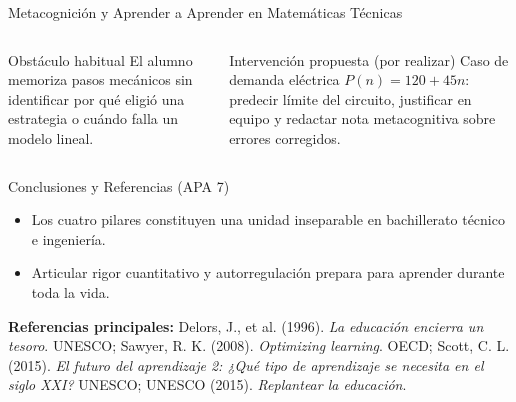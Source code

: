 \documentclass[aspectratio=169,spanish,xcolor=table]{beamer}
\begin{document}
\begin{frame}{Metacognición y Aprender a Aprender en Matemáticas Técnicas}
  \begin{columns}[T]
      \begin{block}{Obstáculo habitual}
        El alumno memoriza pasos mecánicos sin identificar por qué eligió una estrategia o cuándo falla un modelo lineal.
      \end{block}
      \begin{block}{Intervención propuesta (por realizar)}
        Caso de demanda eléctrica $P(n) = 120 + 45n$: predecir límite del circuito, justificar en equipo y redactar nota metacognitiva sobre errores corregidos.
      \end{block}
  \end{columns}
\end{frame}

\begin{frame}{Conclusiones y Referencias (APA 7)}
  \begin{itemize}\small
    \item Los cuatro pilares constituyen una unidad inseparable en bachillerato técnico e ingeniería.
    \item Articular rigor cuantitativo y autorregulación prepara para aprender durante toda la vida.
  \end{itemize}
  \vspace{0.3cm}
  \scriptsize
  \textbf{Referencias principales:} Delors, J., et al. (1996). \textit{La educación encierra un tesoro}. UNESCO; Sawyer, R. K. (2008). \textit{Optimizing learning}. OECD; Scott, C. L. (2015). \textit{El futuro del aprendizaje 2: ¿Qué tipo de aprendizaje se necesita en el siglo XXI?} UNESCO; UNESCO (2015). \textit{Replantear la educación}.
\end{frame}
\end{document}
